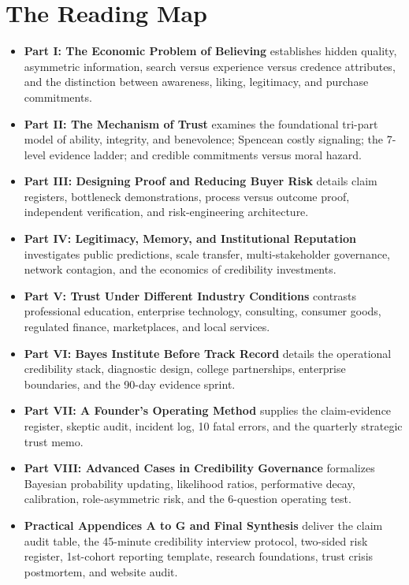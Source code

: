 \section*{The Reading Map}

\begin{itemize}
\item \textbf{Part I: The Economic Problem of Believing} establishes hidden quality, asymmetric information, search versus experience versus credence attributes, and the distinction between awareness, liking, legitimacy, and purchase commitments.
\item \textbf{Part II: The Mechanism of Trust} examines the foundational tri-part model of ability, integrity, and benevolence; Spencean costly signaling; the 7-level evidence ladder; and credible commitments versus moral hazard.
\item \textbf{Part III: Designing Proof and Reducing Buyer Risk} details claim registers, bottleneck demonstrations, process versus outcome proof, independent verification, and risk-engineering architecture.
\item \textbf{Part IV: Legitimacy, Memory, and Institutional Reputation} investigates public predictions, scale transfer, multi-stakeholder governance, network contagion, and the economics of credibility investments.
\item \textbf{Part V: Trust Under Different Industry Conditions} contrasts professional education, enterprise technology, consulting, consumer goods, regulated finance, marketplaces, and local services.
\item \textbf{Part VI: Bayes Institute Before Track Record} details the operational credibility stack, diagnostic design, college partnerships, enterprise boundaries, and the 90-day evidence sprint.
\item \textbf{Part VII: A Founder's Operating Method} supplies the claim-evidence register, skeptic audit, incident log, 10 fatal errors, and the quarterly strategic trust memo.
\item \textbf{Part VIII: Advanced Cases in Credibility Governance} formalizes Bayesian probability updating, likelihood ratios, performative decay, calibration, role-asymmetric risk, and the 6-question operating test.
\item \textbf{Practical Appendices A to G and Final Synthesis} deliver the claim audit table, the 45-minute credibility interview protocol, two-sided risk register, 1st-cohort reporting template, research foundations, trust crisis postmortem, and website audit.
\end{itemize}

